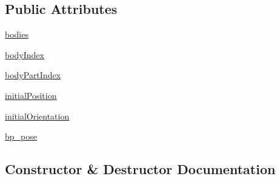 \subsection*{Public Attributes}
\begin{DoxyCompactItemize}
\item 
\hyperlink{classpybullet-gym_1_1pybulletgym_1_1envs_1_1mujoco_1_1robots_1_1robot__bases_1_1_body_part_ae0e99371ef2718c7edeaf1ca04051256}{bodies}
\item 
\hyperlink{classpybullet-gym_1_1pybulletgym_1_1envs_1_1mujoco_1_1robots_1_1robot__bases_1_1_body_part_a29ba7cdcd3ed8af5bc4ca1b7ffdcb067}{body\+Index}
\item 
\hyperlink{classpybullet-gym_1_1pybulletgym_1_1envs_1_1mujoco_1_1robots_1_1robot__bases_1_1_body_part_af44bf7df9e7201c08a5235a3ebacff2c}{body\+Part\+Index}
\item 
\hyperlink{classpybullet-gym_1_1pybulletgym_1_1envs_1_1mujoco_1_1robots_1_1robot__bases_1_1_body_part_a85f8c805fa6a6e5af1378ecf9d6ad8f0}{initial\+Position}
\item 
\hyperlink{classpybullet-gym_1_1pybulletgym_1_1envs_1_1mujoco_1_1robots_1_1robot__bases_1_1_body_part_ab97b097d5336520cd79f83789e68f204}{initial\+Orientation}
\item 
\hyperlink{classpybullet-gym_1_1pybulletgym_1_1envs_1_1mujoco_1_1robots_1_1robot__bases_1_1_body_part_a9fe9423ccc005bf572417535b058a39e}{bp\+\_\+pose}
\end{DoxyCompactItemize}


\subsection{Constructor \& Destructor Documentation}
